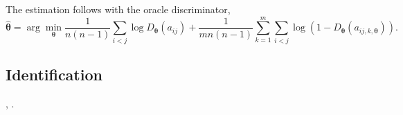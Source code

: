 The estimation follows \citet[KMP]{kaji/manresa/pouliot:2022:adversarial_est} with the oracle discriminator,
\[
    \hat{\bm{\theta }} = \arg\min_{\bm{\theta}} \frac{1}{n \left( n-1 \right) } \sum_{i < j} \log D_{\bm{\theta }} \left( a_{ij}  \right) +  \frac{1}{m n \left( n-1 \right) } \sum_{k=1}^{m} \sum_{i < j} \log  \left( 1 - D_{\bm{\theta}} \left( a_{ij, k, \bm{\theta}} \right)  \right).
\]

\subsection{Identification}

\citet{chatterjee/diaconis/sly:2011:randomgraph}, \citet{gao:2020:identification}.

\newpage










